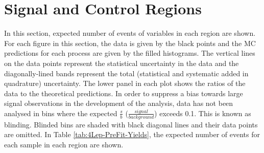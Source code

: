 \section{Signal and Control Regions}
\label{sec:sig-and-control-regions}
In this section, expected number of events of variables in each region are shown. For each figure in this section, the data is given by the black points and the MC predictions for each process are given by the filled histograms. The vertical lines on the data points represent the statistical uncertainty in the data and the diagonally-lined bands represent the total (statistical and systematic added in quadrature) uncertainty. The lower panel in each plot shows the ratios of the data to the theoretical predictions. In order to suppress a bias towards large signal observations in the development of the analysis, data has not been analysed in bins where the expected $\frac{s}{b}$ ($\frac{signal}{background}$) exceeds 0.1. This is known as blinding. Blinded bins are shaded with black diagonal lines and their data points are omitted. In Table \ref{tab:4Lep-PreFit-Yields}, the expected number of events for each sample in each region are shown.
